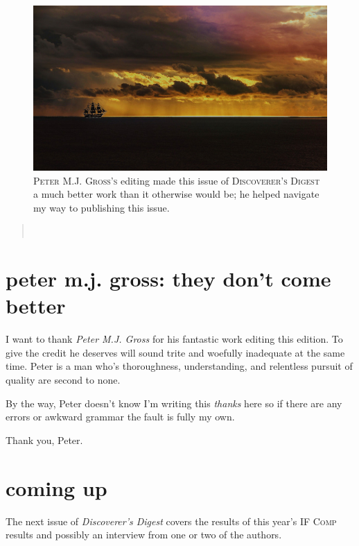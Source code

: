 \begin{figure}[h]                                                           
 \includegraphics[width=\linewidth]{./media/images/boat}%
  \small{\textsc{\\ Peter M.J. Gross's} editing made this issue of
    \textsc{Discoverer's Digest} a much better work than it otherwise would be;
    he helped navigate my way to publishing this issue.}
  \label{fig:boat}%
\end{figure}                                                                
\begin{quotation} 
\noindent{}\\[2mm]
   \hfill{}
\end{quotation} 

\section{peter m.j. gross: they don't come better}
\lettrine[lines=3]{\color{BrickRed}I}{\enspace} want to thank \textit{Peter M.J. Gross} for his fantastic work editing this
edition. To give the credit he deserves will sound trite and woefully inadequate
at the same time. Peter is a man who's thoroughness, understanding, and
relentless pursuit of quality are second to none.

By the way, Peter doesn't know I'm writing this \textit{thanks} here so if there are any
errors or awkward grammar the fault is fully my own.

\noindent Thank you, Peter.


\section{coming up}
The next issue of \textit{Discoverer's Digest} covers the results of this year's
\textsc{IF Comp} results and possibly an interview from one or two of the authors.

